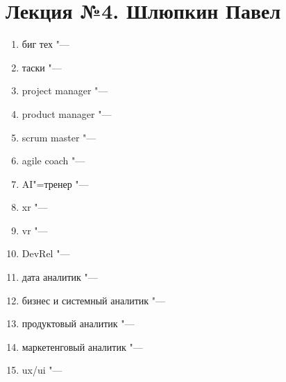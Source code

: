 \documentclass{article}
\begin{document}
\section{Лекция №4. Шлюпкин Павел}
\begin{enumerate}
    \item биг тех "--- 
    \item таски "--- 
    \item project manager "---
    \item product manager "--- 
    \item scrum master "---
    \item agile coach "---
    \item AI"=тренер "---
    \item xr "---
    \item vr "---
    \item DevRel "---
    \item дата аналитик "---
    \item бизнес и системный аналитик "---
    \item продуктовый аналитик "---
    \item маркетенговый аналитик "---
    \item ux/ui "---
\end{enumerate}
\end{document}
